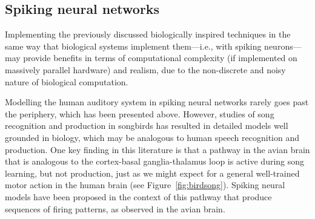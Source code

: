 \documentclass{article}
\begin{document}
\subsection{Spiking neural networks}
\label{subsec:spiking}

Implementing the previously discussed
biologically inspired techniques in the same way
that biological systems implement
them---i.e., with spiking neurons---may
provide benefits in terms of
computational complexity
(if implemented on massively parallel hardware)
and realism, due to the non-discrete
and noisy nature of biological computation.

Modelling the human auditory system
in spiking neural networks
rarely goes past the periphery,
which has been presented above.
However, studies of
song recognition and production
in songbirds has resulted in
detailed models well grounded in biology,
which may be analogous
to human speech recognition and production.
One key finding in this literature
is that a pathway in the avian brain
that is analogous to
the cortex-basal ganglia-thalamus loop
is active during song learning,
but not production,
just as we might expect
for a general well-trained motor action
in the human brain
(see Figure~\ref{fig:birdsong}).
Spiking neural models have been proposed
in the context of this pathway
that produce sequences of firing patterns,
as observed in the avian brain.
\end{document}
